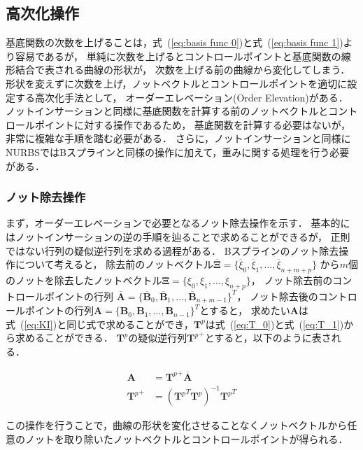 \subsection{高次化操作}
基底関数の次数を上げることは，式~(\ref{eq:basis func 0})と式~(\ref{eq:basis func 1})より容易であるが，
単純に次数を上げるとコントロールポイントと基底関数の線形結合で表される曲線の形状が，
次数を上げる前の曲線から変化してしまう．
形状を変えずに次数を上げ，ノットベクトルとコントロールポイントを適切に設定する高次化手法として，
オーダーエレベーション(Order Elevation)がある．
ノットインサーションと同様に基底関数を計算する前のノットベクトルとコントロールポイントに対する操作であるため，
基底関数を計算する必要はないが，非常に複雑な手順を踏む必要がある．
さらに，ノットインサーションと同様にNURBSではBスプラインと同様の操作に加えて，重みに関する処理を行う必要がある．

\subsubsection{ノット除去操作}
まず，オーダーエレベーションで必要となるノット除去操作を示す．
基本的にはノットインサーションの逆の手順を辿ることで求めることができるが，
正則ではない行列の疑似逆行列を求める過程がある．
Bスプラインのノット除去操作について考えると，
除去前のノットベクトル$\overline{\boldsymbol{\Xi}} = \{\overline{\xi}_0, \overline{\xi}_1, \dots, \overline{\xi}_{n+m+p}\}$
から$m$個のノットを除去したノットベクトル$\boldsymbol{\Xi} = \{\xi_0, \xi_1, \dots, \xi_{n+p}\}$，
ノット除去前のコントロールポイントの行列
$\overline{\boldsymbol{A}} = \{\overline{\boldsymbol{B}}_0, \overline{\boldsymbol{B}}_1, \dots, \overline{\boldsymbol{B}}_{n+m-1}\}^T$，
ノット除去後のコントロールポイントの行列$\boldsymbol{A} = \{\boldsymbol{B}_0, \boldsymbol{B}_1, \dots, \boldsymbol{B}_{n-1}\}^T$とすると，
求めたい$\boldsymbol{A}$は式~(\ref{eq:KI})と同じ式で求めることができ，$\boldsymbol{T}^p$は式~(\ref{eq:T_0})と式~(\ref{eq:T_1})から求めることができる．
$\boldsymbol{T}^p$の疑似逆行列${\boldsymbol{T}^p}^{+}$とすると，以下のように表される．

\begin{align}
  \boldsymbol{A} &= {\boldsymbol{T}^p}^{+} \overline{\boldsymbol{A}}\\
  {\boldsymbol{T}^p}^{+} &= ({\boldsymbol{T}^p}^T \boldsymbol{T}^p)^{-1} {\boldsymbol{T}^p}^T
\end{align}

\noindent
この操作を行うことで，曲線の形状を変化させることなくノットベクトルから任意のノットを取り除いたノットベクトルとコントロールポイントが得られる．


